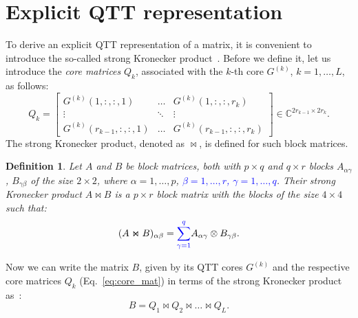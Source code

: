 \documentclass[a4paper]{article}
\newtheorem{definition}{Definition}[section]
\newcommand{\LL}{L}
\begin{document}
	


\section{Explicit QTT representation} \label{sec:qtt_repr}

To derive an explicit QTT representation of a matrix, it is convenient to introduce the so-called strong Kronecker product~\cite{khkaz-lap-2012}.
Before we define it, let us introduce the \emph{core matrices} $Q_k$, associated with the $k$-th core $G^{(k)}$, $k=1,\dots,\LL$, as follows:
\begin{equation}\label{eq:core_mat}
    Q_k = 
    \begin{bmatrix}
        G^{(k)}(1, :, :, 1) & \dots & G^{(k)}(1, :, :, r_k) \\
        \vdots & \ddots & \vdots \\
        G^{(k)}(r_{k-1}, :, :, 1) & \dots & G^{(k)}(r_{k-1}, :, :, r_k)
    \end{bmatrix}
    \in\mathbb{C}^{2r_{k-1} \times 2r_k}.
\end{equation}
The strong Kronecker product, denoted as $\Join$, is defined for such block matrices. 
\begin{definition}
Let $A$ and $B$ be block matrices, both with $p\times q$ and $q\times r$ blocks $A_{\alpha\gamma}$, $B_{\gamma\beta}$ of the size $2\times 2$, where $\alpha=1,\dots,p$, \textcolor{blue}{$\beta=1,\dots,r$, $\gamma=1,\dots,q$}. Their strong Kronecker product $A\Join B$ is a $p\times r$ block matrix with the blocks of the size $4\times 4$ such that:
\[
    (A\Join B)_{\alpha\beta} = \textcolor{blue}{\sum_{\gamma=1}^q} A_{\alpha\gamma} \otimes B_{\gamma \beta}.
\]
\end{definition}
Now we can write the matrix $B$, given by its QTT cores $G^{(k)}$ and the respective core matrices $Q_k$ (Eq.~\eqref{eq:core_mat}) in terms of the strong Kronecker product as~\cite{khkaz-lap-2012}:
\[
    B = Q_1 \Join Q_2 \Join \dots \Join Q_\LL.
\]
\end{document}
